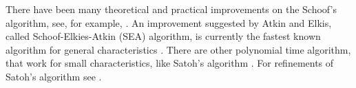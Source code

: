 There have been many theoretical and practical improvements on the Schoof's algorithm, see, for 
example, \cite{Blake1999, Elkies1998, Schoof1995}. An improvement suggested by Atkin and Elkis, 
called Schoof-Elkies-Atkin (SEA) algorithm, is currently the fastest known algorithm for general 
characteristics \cite{Blake1999}. There are other polynomial time algorithm, that work for small 
characteristics, like Satoh's algorithm \cite{Satoh2000}. For refinements of Satoh's algorithm see 
\cite{SatohSkTa2003, Satoh2002, VerPreVan2001}.